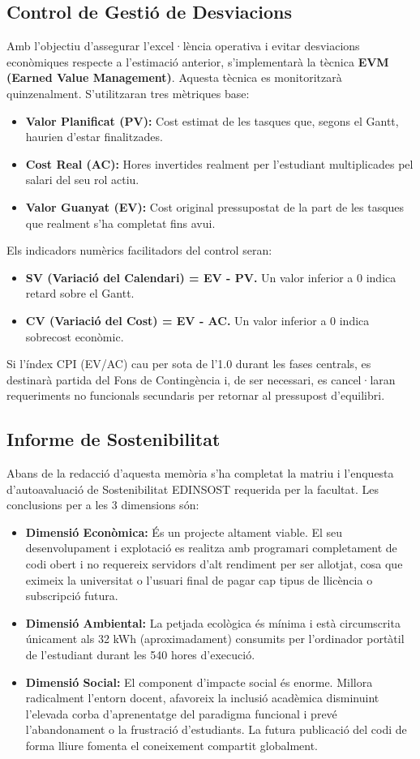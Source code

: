 \subsection{Control de Gestió de Desviacions}
Amb l'objectiu d'assegurar l'excel·lència operativa i evitar desviacions econòmiques respecte a l'estimació anterior, s'implementarà la tècnica \textbf{EVM (Earned Value Management)}. Aquesta tècnica es monitoritzarà quinzenalment. S'utilitzaran tres mètriques base:
\begin{itemize}
    \item \textbf{Valor Planificat (PV):} Cost estimat de les tasques que, segons el Gantt, haurien d'estar finalitzades.
    \item \textbf{Cost Real (AC):} Hores invertides realment per l'estudiant multiplicades pel salari del seu rol actiu.
    \item \textbf{Valor Guanyat (EV):} Cost original pressupostat de la part de les tasques que realment s'ha completat fins avui.
\end{itemize}
Els indicadors numèrics facilitadors del control seran:
\begin{itemize}
    \item \textbf{SV (Variació del Calendari) = EV - PV.} Un valor inferior a 0 indica retard sobre el Gantt.
    \item \textbf{CV (Variació del Cost) = EV - AC.} Un valor inferior a 0 indica sobrecost econòmic.
\end{itemize}
Si l'índex CPI (EV/AC) cau per sota de l'1.0 durant les fases centrals, es destinarà partida del Fons de Contingència i, de ser necessari, es cancel·laran requeriments no funcionals secundaris per retornar al pressupost d'equilibri.

\subsection{Informe de Sostenibilitat}
Abans de la redacció d'aquesta memòria s'ha completat la matriu i l'enquesta d'autoavaluació de Sostenibilitat EDINSOST requerida per la facultat. Les conclusions per a les 3 dimensions són:
\begin{itemize}
    \item \textbf{Dimensió Econòmica:} És un projecte altament viable. El seu desenvolupament i explotació es realitza amb programari completament de codi obert i no requereix servidors d'alt rendiment per ser allotjat, cosa que eximeix la universitat o l'usuari final de pagar cap tipus de llicència o subscripció futura.
    \item \textbf{Dimensió Ambiental:} La petjada ecològica és mínima i està circumscrita únicament als 32 kWh (aproximadament) consumits per l'ordinador portàtil de l'estudiant durant les 540 hores d'execució.
    \item \textbf{Dimensió Social:} El component d'impacte social és enorme. Millora radicalment l'entorn docent, afavoreix la inclusió acadèmica disminuint l'elevada corba d'aprenentatge del paradigma funcional i prevé l'abandonament o la frustració d'estudiants. La futura publicació del codi de forma lliure fomenta el coneixement compartit globalment.
\end{itemize}

